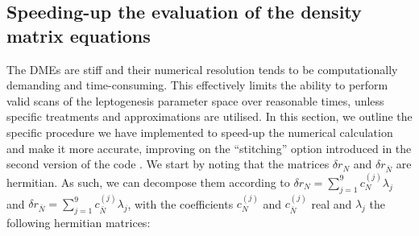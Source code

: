 \documentclass[12pt, a4paper]{article}
\newcommand{\virg}[1]{``#1''}
\begin{document}
\subsection{Speeding-up the evaluation of the density matrix equations}\label{app:numerical}
The DMEs are stiff and their numerical resolution tends to be computationally demanding and time-consuming. This effectively limits the ability to perform valid scans of the leptogenesis parameter space over reasonable times, unless specific treatments and approximations are utilised. In this section, we outline the specific procedure we have implemented to speed-up the numerical calculation and make it more accurate, improving on the \virg{stitching} option introduced in the second version of the code \cite{Granelli:2023vcm}. We start by noting that the matrices $\delta r_N$ and $\delta r_{\bar{N}}$ are hermitian. As such, we can decompose them according to $\delta r_N = \sum_{j=1}^9 c_N^{(j)}\lambda_j$ and $\delta r_{\bar{N}} = \sum_{j=1}^9 c_{\bar{N}}^{(j)}\lambda_j$, with the coefficients $c_N^{(j)}$ and $c_{\bar{N}}^{(j)}$ real and $\lambda_j$ the following hermitian matrices:
\end{document}
